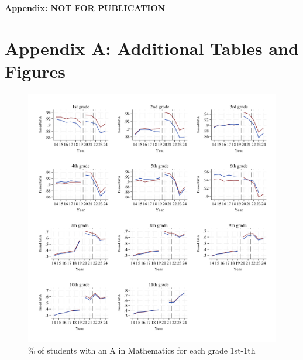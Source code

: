 \clearpage

\setcounter{figure}{0}
\renewcommand\thefigure{A.\arabic{figure}}    

\setcounter{table}{0}
\renewcommand{\thetable}{A.\arabic{table}}
\setcounter{subsection}{0}

\begin{center}
\huge
\textbf{Appendix: NOT FOR PUBLICATION}
\normalsize
\end{center}


\section*{Appendix A: Additional Tables and Figures} \label{sec:appa}
\newpage



\begin{figure}[htbp]
         \centering
        \includegraphics[width=\textwidth]{./FIGURES/Descriptive/raw_grades_pass_math_siblings.pdf}
        \caption{\% of students with an A in Mathematics for each grade 1st-1th}
        \label{fig:trend_pass_grades}
\end{figure}

